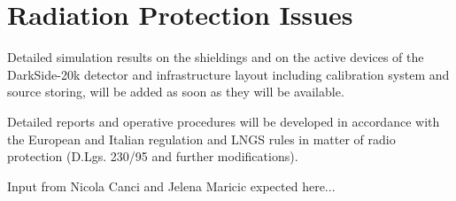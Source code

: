 \section{Radiation Protection Issues}
\label{sec:RadioProtection}


Detailed simulation results on the shieldings and on the active devices of the DarkSide-20k detector and infrastructure layout including calibration system and source storing, will be added as soon as they will be available.

Detailed reports and operative procedures will be developed in accordance with the European and Italian regulation and LNGS rules in matter of radio protection (D.Lgs. 230/95 and further modifications).


Input from Nicola Canci and Jelena Maricic expected here...

